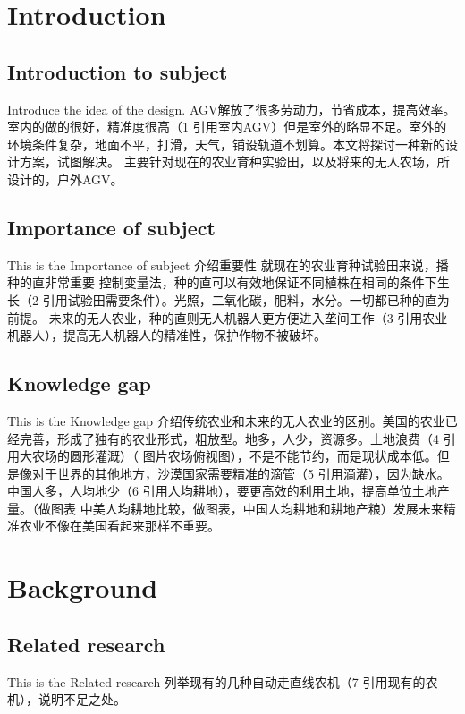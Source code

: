\documentclass[12pt]{article}
\begin{document}
\begin{flushleft}

\section{Introduction}

\subsection{Introduction to subject}
Introduce the idea of the design.
AGV解放了很多劳动力，节省成本，提高效率。室内的做的很好，精准度很高（1 引用室内AGV）但是室外的略显不足。室外的环境条件复杂，地面不平，打滑，天气，铺设轨道不划算。本文将探讨一种新的设计方案，试图解决。
主要针对现在的农业育种实验田，以及将来的无人农场，所设计的，户外AGV。

\subsection{Importance of subject}
This is the Importance of subject 介绍重要性
就现在的农业育种试验田来说，播种的直非常重要
控制变量法，种的直可以有效地保证不同植株在相同的条件下生长（2 引用试验田需要条件）。光照，二氧化碳，肥料，水分。一切都已种的直为前提。
未来的无人农业，种的直则无人机器人更方便进入垄间工作（3 引用农业机器人），提高无人机器人的精准性，保护作物不被破坏。

\subsection{Knowledge gap}
This is the Knowledge gap 介绍传统农业和未来的无人农业的区别。美国的农业已经完善，形成了独有的农业形式，粗放型。地多，人少，资源多。土地浪费（4 引用大农场的圆形灌溉）（  图片农场俯视图），不是不能节约，而是现状成本低。但是像对于世界的其他地方，沙漠国家需要精准的滴管（5 引用滴灌），因为缺水。中国人多，人均地少（6 引用人均耕地），要更高效的利用土地，提高单位土地产量。（做图表 中美人均耕地比较，做图表，中国人均耕地和耕地产粮）发展未来精准农业不像在美国看起来那样不重要。

\section{Background}

\subsection{Related research}
This is the Related research
列举现有的几种自动走直线农机（7 引用现有的农机），说明不足之处。


\end{flushleft}
\end{document}
